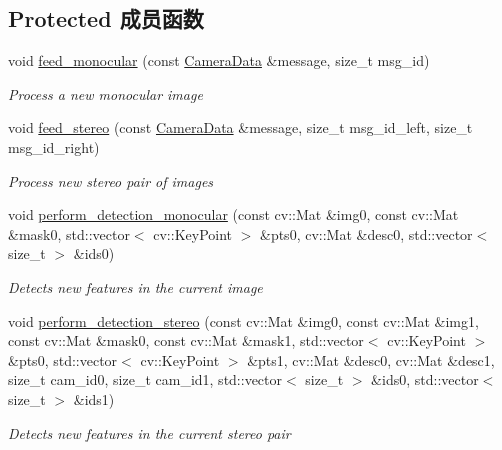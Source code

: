 \subsection*{Protected 成员函数}
\begin{DoxyCompactItemize}
\item 
void \hyperlink{classov__core_1_1TrackDescriptor_ada58eab951f766db88f48879d30b72b7}{feed\+\_\+monocular} (const \hyperlink{structov__core_1_1CameraData}{Camera\+Data} \&message, size\+\_\+t msg\+\_\+id)
\begin{DoxyCompactList}\small\item\em Process a new monocular image \end{DoxyCompactList}\item 
void \hyperlink{classov__core_1_1TrackDescriptor_a4f182f8ee96c73f9105a8a1fa3f5eee1}{feed\+\_\+stereo} (const \hyperlink{structov__core_1_1CameraData}{Camera\+Data} \&message, size\+\_\+t msg\+\_\+id\+\_\+left, size\+\_\+t msg\+\_\+id\+\_\+right)
\begin{DoxyCompactList}\small\item\em Process new stereo pair of images \end{DoxyCompactList}\item 
void \hyperlink{classov__core_1_1TrackDescriptor_a5f1db51d0c57dab6ed1da4dc17add0a1}{perform\+\_\+detection\+\_\+monocular} (const cv\+::\+Mat \&img0, const cv\+::\+Mat \&mask0, std\+::vector$<$ cv\+::\+Key\+Point $>$ \&pts0, cv\+::\+Mat \&desc0, std\+::vector$<$ size\+\_\+t $>$ \&ids0)
\begin{DoxyCompactList}\small\item\em Detects new features in the current image \end{DoxyCompactList}\item 
void \hyperlink{classov__core_1_1TrackDescriptor_a0f3bfb96dcfc50ce8ebc1e40171d50c0}{perform\+\_\+detection\+\_\+stereo} (const cv\+::\+Mat \&img0, const cv\+::\+Mat \&img1, const cv\+::\+Mat \&mask0, const cv\+::\+Mat \&mask1, std\+::vector$<$ cv\+::\+Key\+Point $>$ \&pts0, std\+::vector$<$ cv\+::\+Key\+Point $>$ \&pts1, cv\+::\+Mat \&desc0, cv\+::\+Mat \&desc1, size\+\_\+t cam\+\_\+id0, size\+\_\+t cam\+\_\+id1, std\+::vector$<$ size\+\_\+t $>$ \&ids0, std\+::vector$<$ size\+\_\+t $>$ \&ids1)
\begin{DoxyCompactList}\small\item\em Detects new features in the current stereo pair \end{DoxyCompactList}\item 

\end{DoxyCompactItemize}
